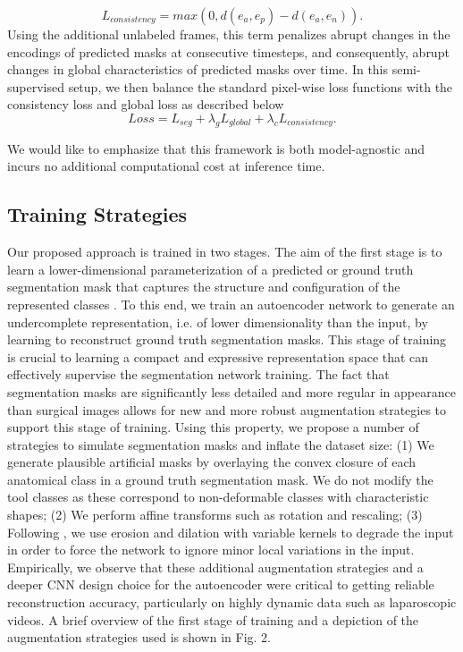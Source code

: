\documentclass[twoside, print]{ieeecolor_arxiv}
\begin{document}
\begin{equation}
L_{consistency} = max(0, d(e_{a}, e_{p}) - d(e_{a}, e_{n})).
\end{equation}
Using the additional unlabeled frames, this term penalizes abrupt changes in the encodings of predicted masks at consecutive timesteps, and consequently, abrupt changes in global characteristics of predicted masks over time. In this semi-supervised setup, we then balance the standard pixel-wise loss functions with the consistency loss and global loss as described below
\begin{equation}
Loss = L_{seg}+ \lambda _{g}L_{global}+ \lambda _{c}L_{consistency}.
\end{equation}

We would like to emphasize that this framework is both model-agnostic and incurs no additional computational cost at inference time.

\subsection{Training Strategies}
Our proposed approach is trained in two stages. The aim of the first stage is to learn a lower-dimensional parameterization of a predicted or ground truth segmentation mask that captures the structure and configuration of the represented classes \cite{acnn}\cite{vconv-dae}. To this end, we train an autoencoder network to generate an undercomplete representation, i.e. of lower dimensionality than the input, by learning to reconstruct ground truth segmentation masks. This stage of training is crucial to learning a compact and expressive representation space that can effectively supervise the segmentation network training. The fact that segmentation masks are significantly less detailed and more regular in appearance than surgical images allows for new and more robust augmentation strategies to support this stage of training. Using this property, we propose a number of strategies to simulate segmentation masks and inflate the dataset size: (1) We generate plausible artificial masks by overlaying the convex closure of each anatomical class in a ground truth segmentation mask. We do not modify the tool classes as these correspond to non-deformable classes with characteristic shapes; (2) We perform affine transforms such as rotation and rescaling; (3)  Following \cite{postdae1}, we use erosion and dilation with variable kernels to degrade the input in order to force the network to ignore minor local variations in the input. Empirically, we observe that these additional augmentation strategies and a deeper CNN design choice for the autoencoder were critical to getting reliable reconstruction accuracy, particularly on highly dynamic data such as laparoscopic videos. A brief overview of the first stage of training and a depiction of the augmentation strategies used is shown in Fig. 2.
\end{document}
